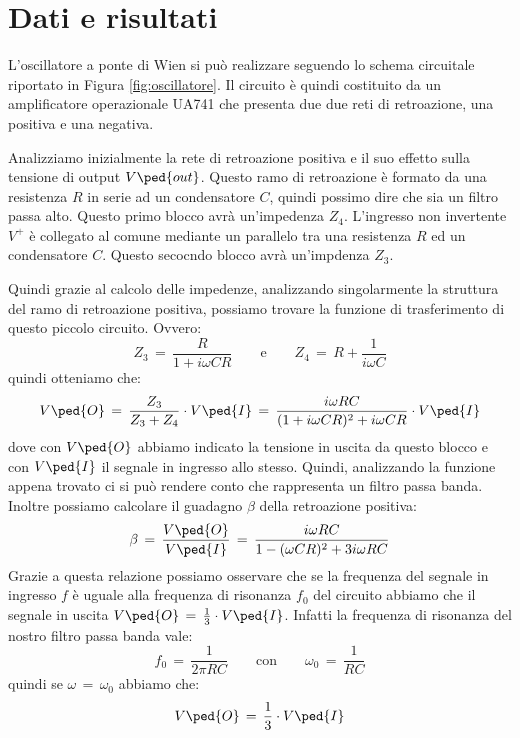 \section*{Dati e risultati}

L'oscillatore a ponte di Wien si può realizzare seguendo lo schema circuitale riportato in Figura \ref{fig:oscillatore}.
Il circuito è quindi costituito da un amplificatore operazionale UA741 che presenta due due reti di retroazione, una positiva e una negativa.

Analizziamo inizialmente la rete di retroazione positiva e il suo effetto sulla tensione di output $V\ped{out}$.
Questo ramo di retroazione è formato da una resistenza $R$ in serie ad un condensatore $C$, quindi possimo dire che sia un filtro passa alto. Questo primo blocco avrà un'impedenza $Z_4$. L'ingresso non invertente $V^+$ è collegato al comune mediante un parallelo tra una resistenza $R$ ed un condensatore $C$. Questo secocndo blocco avrà un'impdenza $Z_3$.

Quindi grazie al calcolo delle impedenze, analizzando singolarmente la struttura del ramo di retroazione positiva, possiamo trovare la funzione di trasferimento di questo piccolo circuito. Ovvero:
\begin{equation}
	Z_3\,=\,\frac{R}{1 + i \omega C R} \qquad \text{e} \qquad Z_4\,=\,R + \frac{1}{i \omega C}
\end{equation}
quindi otteniamo che:
\begin{equation}
	V\ped{O}\,=\,\frac{Z_3}{Z_3 + Z_4} \cdot V\ped{I}\,=\,\frac{i \omega R C}{(1 + i \omega C R)^2 + i \omega C R} \cdot V\ped{I}
\end{equation}
dove con $V\ped{O}$ abbiamo indicato la tensione in uscita da questo blocco e con $V\ped{I}$ il segnale in ingresso allo stesso.
Quindi, analizzando la funzione appena trovato ci si può rendere conto che rappresenta un filtro passa banda. Inoltre possiamo calcolare il guadagno $\beta$ della retroazione positiva:
\begin{equation}
	\beta\,=\,\frac{V\ped{O}}{V\ped{I}}\,=\,\frac{i \omega R C}{1 - (\omega C R)^2 + 3 i \omega R C}
\end{equation}
Grazie a questa relazione possiamo osservare che se la frequenza del segnale in ingresso $f$ è uguale alla frequenza di risonanza $f_0$ del circuito abbiamo che il segnale in uscita $V\ped{O}\,=\,\frac{1}{3} \cdot V\ped{I}$. Infatti la frequenza di risonanza del nostro filtro passa banda vale:
\begin{equation}
	f_0\,=\, \frac{1}{2 \pi R C} \qquad \text{con} \qquad \omega_0\,=\,\frac{1}{RC}
\end{equation}
quindi se $\omega \,=\, \omega_0$ abbiamo che:
\begin{equation}
	V\ped{O}\,=\,\frac{1}{3} \cdot V\ped{I}
\end{equation}

